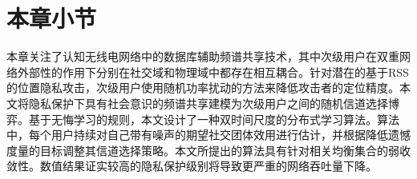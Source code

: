 \section{本章小节}\label{sec:con}
本章关注了认知无线电网络中的数据库辅助频谱共享技术，其中次级用户在双重网络外部性的作用下分别在社交域和物理域中都存在相互耦合。针对潜在的基于RSS的位置隐私攻击，次级用户使用随机功率扰动的方法来降低攻击者的定位精度。本文将隐私保护下具有社会意识的频谱共享建模为次级用户之间的随机信道选择博弈。基于无悔学习的规则，本文设计了一种双时间尺度的分布式学习算法。算法中，每个用户持续对自己带有噪声的期望社交团体效用进行估计，并根据降低遗憾度量的目标调整其信道选择策略。本文所提出的算法具有针对相关均衡集合的弱收敛性。数值结果证实较高的隐私保护级别将导致更严重的网络吞吐量下降。

